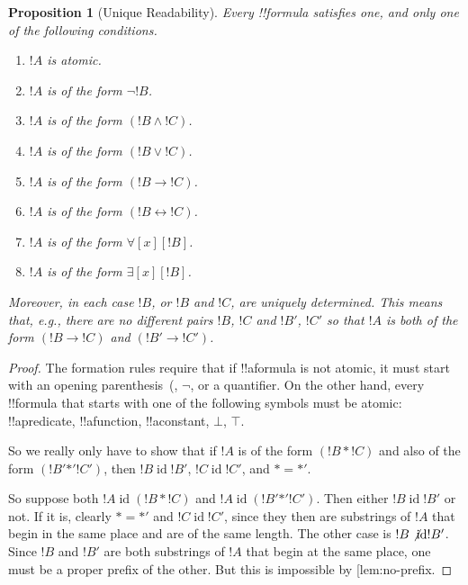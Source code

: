 \documentclass[10pt,a4paper]{article}
\makeatletter
\theoremstyle{plain}
\newtheorem{prop}[thm]{Proposition}
\theoremstyle{definition}
\theoremstyle{remark}
\newcommand{\olref}{\@ifnextchar[{\olref@i}{\olref@final}}
\def\olref@i[#1]{\@ifnextchar[{\olref@ii}{\olref@final}}
\def\olref@ii[#1]{\@ifnextchar[{\olref@iii}{\olref@final}}
\def\olref@iii[#1]{\olref@final}
\def\olref@final#1{\ref{#1}}
\providecommand{\lif}{\mathbin{\rightarrow}}
\providecommand{\lforall}{\mathord{\forall}}
\providecommand{\lexists}{\mathord{\exists}}
\providecommand{\ltrue}{\top}
\providecommand{\lfalse}{\bot}
\providecommand{\iftag}[1]{#1}
\providecommand{\tagitem}[1]{\item[#1]}
\providecommand{\liff}{\mathbin{\leftrightarrow}}
\providecommand{\ident}{\operatorname{id}}
\providecommand{\iftag}{}
\def\iftag#1#2#3{\iftag@stop{#2}\iftag@more}
\def\iftag@more{\@ifnextchar\bgroup{\iftag@eat}{\relax}}
\def\iftag@eat#1{}
\def\iftag@stop#1{#1}
\makeatother
\begin{document}
\begin{prop}[Unique Readability]
Every !!{formula} satisfies one, and only one of the following conditions.
\begin{enumerate}
\item $!A$ is atomic.

\tagitem{prvNot}{$!A$ is of the form $\lnot !B$.}{}

\tagitem{prvAnd}{$!A$ is of the form $(!B \land !C)$.}{}

\tagitem{prvOr}{$!A$ is of the form $(!B \lor !C)$.}{}

\tagitem{prvIf}{$!A$ is of the form $(!B \lif !C)$.}{}

\tagitem{prvIff}{$!A$ is of the form $(!B \liff !C)$.}{}

\tagitem{prvAll}{$!A$ is of the form $\lforall[x][!B]$.}{}

\tagitem{prvEx}{$!A$ is of the form $\lexists[x][!B]$.}{}
\end{enumerate}
Moreover, in each case $!B$, or $!B$ and $!C$, are uniquely
determined.  This means that, e.g., there are no different pairs $!B$,
$!C$ and $!B'$, $!C'$ so that $!A$ is both of the form 
\iftag{prvIf}{$(!B \lif !C)$ and $(!B' \lif !C')$.}{
    \iftag{prvOr}{$(!B \lor !C)$ and $(!B' \lor !C')$.}{
      \iftag{prvAnd}{$(!B \land !C)$ and $(!B' \land !C')$.}{}}}
\end{prop}

\begin{proof}
The formation rules require that if !!a{formula} is not atomic, it
must start with an opening parenthesis~(, \iftag{prvNot}{$\lnot$,}{}
or a quantifier. On the other hand, every !!{formula} that starts with
one of the following symbols must be atomic: !!a{predicate}, !!a{function}, !!a{constant}\iftag{prvFalse}{, $\lfalse$}{}\iftag{prvTrue}{, $\ltrue$}{}.

So we really only have to show that if $!A$ is of the form $(!B \ast
!C)$ and also of the form $(!B' \mathbin{\ast'} !C')$, then $!B \ident
!B'$, $!C \ident !C'$, and $\ast = {\ast'}$.

So suppose both $!A \ident (!B \ast !C)$ and $!A \ident (!B'
\mathbin{\ast'} !C')$.  Then either $!B \ident !B'$ or not.  If it is,
clearly $\ast = {\ast'}$ and $!C \ident !C'$, since they then are
substrings of $!A$ that begin in the same place and are of the same
length.  The other case is $!B \not\ident !B'$.  Since $!B$ and
$!B'$ are both substrings of $!A$ that begin at the same place, one
must be a proper prefix of the other.  But this is impossible by
\olref{lem:no-prefix}.
\end{proof}
\end{document}
